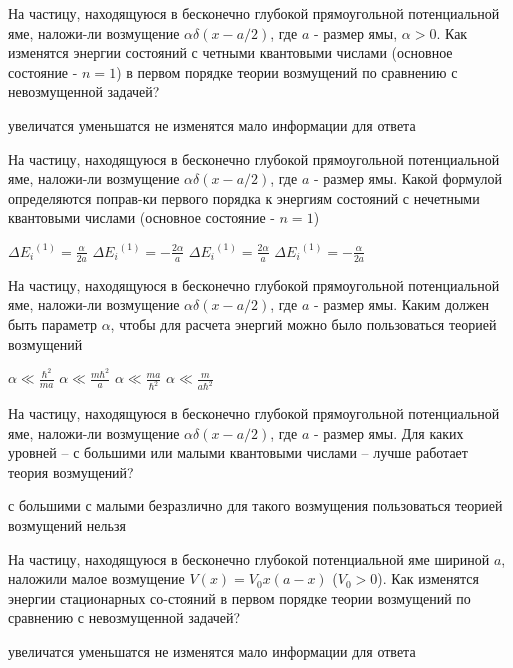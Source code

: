 \documentclass[11pt,a4paper]{exam}
\begin{document}
\begin{questions}
\question На частицу, находящуюся в бесконечно глубокой прямоугольной потенциальной яме, наложи-ли возмущение $\alpha \delta (x - a/2)$, где $a$ - размер ямы, $\alpha  > 0$. Как изменятся энергии состояний с четными квантовыми числами (основное состояние - $n = 1$) в первом порядке теории возмущений по сравнению с невозмущенной задачей?
\begin{choices}
\choice увеличатся     
\choice уменьшатся  
\choice не изменятся   
\choice мало информации для ответа
\end{choices}

\question На частицу, находящуюся в бесконечно глубокой прямоугольной потенциальной яме, наложи-ли возмущение $\alpha \delta (x - a/2)$, где $a$ - размер ямы. Какой формулой определяются поправ-ки первого порядка к энергиям состояний с нечетными квантовыми числами (основное состояние - $n = 1$)
\begin{choices}
\choice $\Delta {E_i}^{(1)} = \frac{\alpha }{{2a}}$     
\choice $\Delta {E_i}^{(1)} =  - \frac{{2\alpha }}{a}$  
\choice $\Delta {E_i}^{(1)} = \frac{{2\alpha }}{a}$  
\choice $\Delta {E_i}^{(1)} =  - \frac{\alpha }{{2a}}$
\end{choices}

\question На частицу, находящуюся в бесконечно глубокой прямоугольной потенциальной яме, наложи-ли возмущение $\alpha \delta (x - a/2)$, где $a$ - размер ямы. Каким должен быть параметр $\alpha $, чтобы для расчета энергий можно было пользоваться теорией возмущений
\begin{choices}
\choice $\alpha  \ll \frac{{{\hbar ^2}}}{{ma}}$      
\choice $\alpha  \ll \frac{{m{\hbar ^2}}}{a}$     
\choice $\alpha  \ll \frac{{ma}}{{{\hbar ^2}}}$      
\choice $\alpha  \ll \frac{m}{{a{\hbar ^2}}}$
\end{choices}

\question На частицу, находящуюся в бесконечно глубокой прямоугольной потенциальной яме, наложи-ли возмущение $\alpha \delta (x - a/2)$, где $a$ - размер ямы. Для каких уровней – с большими или малыми квантовыми числами – лучше работает теория возмущений?
\begin{choices}
\choice с большими     
\choice с малыми    
\choice безразлично    
\choice для такого возмущения пользоваться теорией возмущений нельзя
\end{choices}

\question На частицу, находящуюся в бесконечно глубокой потенциальной яме шириной $a$, наложили малое возмущение $V(x) = {V_0}x(a - x)$ (${V_0} > 0$). Как изменятся энергии стационарных со-стояний в первом порядке теории возмущений по сравнению с невозмущенной задачей?
\begin{choices}
\choice увеличатся     
\choice уменьшатся  
\choice не изменятся   
\choice мало информации для ответа
\end{choices}


\end{questions}
\end{document}
